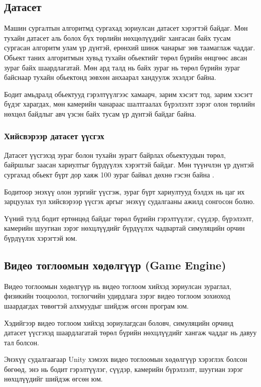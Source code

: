 \newpage
\subsection{Датасет}

Машин сургалтын алгоритмд сургахад зориулсан датасет хэрэгтэй байдаг. Мөн тухайн датасет аль болох бүх төрлийн нөхцөлүүдийг хангасан байх тусам сургасан алгоритм улам үр дүнтэй, ерөнхий шинж чанарыг зөв таамаглаж чаддаг.
Обьект таних алгоритмын хувьд тухайн обьектийг төрөл бүрийн өнцгөөс авсан зураг байх шаардлагатай. Мөн ард талд нь байх зураг нь төрөл бүрийн зураг байснаар тухайн обьектонд зөвхөн анхаарал хандуулж эхэлдэг байна.

Бодит амьдралд обьектууд гэрэлтүүлгээс хамаарч, зарим хэсэгт тод, зарим хэсэгт бүдэг харагдах, мөн камерийн чанараас шалтгаалах бүрэлзэлт зэрэг олон төрлийн нөхцөл байдлыг авч үзсэн байх тусам үр дүнтэй байдаг байна.

\subsubsection{Хийсвэрээр датасет үүсгэх}

Датасет үүсгэхэд зураг болон тухайн зурагт байрлах обьектуудын төрөл, байршлыг заасан хариултыг бүрдүүлэх хэрэгтэй байдаг.
Мөн түүнчлэн үр дүнтэй сургахад обьект бүрт дор хаяж 100 зураг байвал дөхнө гэсэн байна \cite{jocher2023minimum}.

Бодитоор энэхүү олон зургийг үүсгэж, зураг бүрт хариултууд бэлдэх нь цаг их зарцуулах тул хийсвэрээр үүсгэх аргыг энэхүү судалгааны ажилд сонгосон болно.

Үүний тулд бодит ертөнцөд байдаг төрөл бүрийн гэрэлтүүлэг, сүүдэр, бүрэлзэлт, камерийн шуугиан зэрэг нөхцлүүдийг бүрдүүлэх чадвартай симуляцийн орчин бүрдүүлэх хэрэгтэй юм.

\subsection{Видео тоглоомын хөдөлгүүр (Game Engine)}

Видео тоглоомын хөдөлгүүр нь видео тоглоом хийхэд зориулсан зураглал, физикийн тооцоолол, тоглогчийн удирдлага зэрэг видео тоглоом зохиоход шаардагдах төвөгтэй алхмуудыг шийдэж өгсөн програм юм.

Хэдийгээр видео тоглоом хийхэд зориулагдсан боловч, симуляцийн орчинд датасет үүсгэхэд шаардлагатай төрөл бүрийн нөхцлүүдийг хангаж чаддаг нь давуу тал болсон.

Энэхүү судалгаагаар Unity хэмээх видео тоглоомын хөдөлгүүр хэрэглэх болсон бөгөөд, энэ нь бодит гэрэлтүүлэг, сүүдэр, камерийн бүрэлзэлт, шуугиан зэрэг нөхцлүүдийг шийдэж өгсөн юм.

